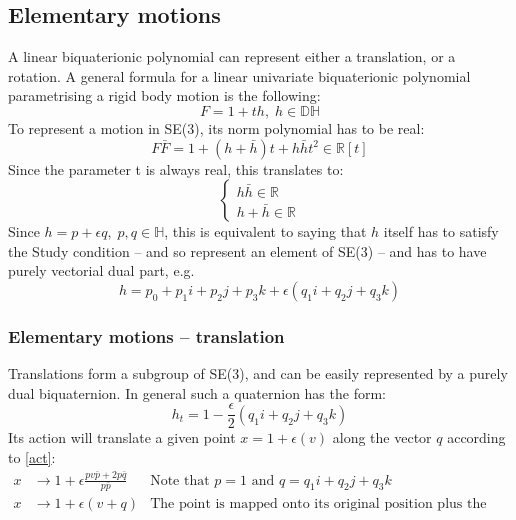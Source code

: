 \subsection{Elementary motions}
A linear biquaterionic polynomial can represent either a translation, or a rotation. 
A general formula for a linear univariate biquaterionic polynomial parametrising a rigid body motion is the following:
\begin{equation}
    F = 1+th,\; h \in \mathbb{DH}
\end{equation}
To represent a motion in SE(3), its norm polynomial has to be real:
\begin{equation}
    F\bar{F} = 1+(h+\bar{h})t+h\bar{h}t^{2} \in \mathbb{R}[t]
\end{equation}
Since the parameter t is always real, this translates to:
\begin{equation}
    \begin{cases}
        h\bar{h} \in \mathbb{R}\\
        h+\bar{h} \in \mathbb{R}
    \end{cases}
\end{equation}
Since $h = p + \epsilon q,\; p,q \in \mathbb{H}$, this is equivalent to saying that $h$ itself has to satisfy the Study condition -- and so represent an element of SE(3) -- and has to have purely vectorial dual part, e.g.
\begin{equation}
    h = p_0+p_1\mathit{i}+p_2\mathit{j}+p_3\mathit{k} +\epsilon(q_1\mathit{i}+q_2\mathit{j}+q_3\mathit{k})
\end{equation}
\subsubsection{Elementary motions -- translation}
Translations form a subgroup of SE(3), and can be easily represented by a purely dual biquaternion. In general such a quaternion has the form:
\begin{equation}
    h_t = 1 - \frac{\epsilon}{2}(q_1\mathit{i}+q_2\mathit{j}+q_3\mathit{k})
\end{equation}
Its action will translate a given point $x = 1 + \epsilon(v)$ along the vector $q$ according to \ref{act}:
\begin{equation}
    \begin{aligned}
        x &\rightarrow 1 + \epsilon\frac{pv\bar{p} + 2p\bar{q}}{p\bar{p}}&\mbox{Note that $p = 1$ and  $q = q_1\mathit{i}+q_2\mathit{j}+q_3\mathit{k}$}\\[1.25ex]
        x&\rightarrow 1 + \epsilon(v + q)&\mbox{The point is mapped onto its original position plus the translation vector}\\[1.25ex]
    \end{aligned}
\end{equation}

